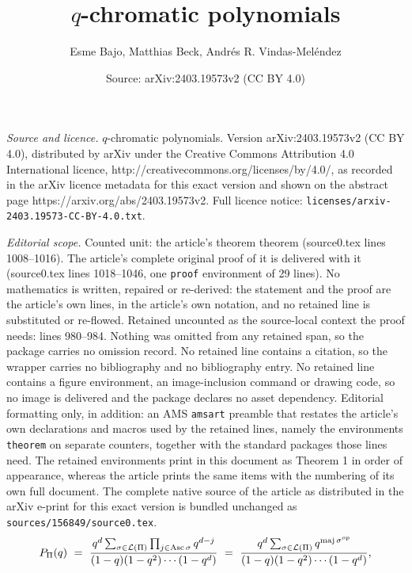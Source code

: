 \documentclass[10pt,a4paper]{amsart}
\title{$q$-chromatic polynomials}
\author{Esme Bajo, Matthias Beck, Andr\'es R. Vindas-Mel\'endez}
\date{Source: arXiv:2403.19573v2 (CC BY 4.0)}
\newcommand\Asc{\operatorname{Asc}}
\newcommand\maj{\operatorname{maj}}
\newcommand\op{^{\rm op}}
\begin{document}
\maketitle

\noindent\emph{Source and licence.} $q$-chromatic polynomials. Version arXiv:2403.19573v2 (CC BY 4.0), distributed by arXiv under the Creative Commons Attribution 4.0 International licence, http://creativecommons.org/licenses/by/4.0/, as recorded in the arXiv licence metadata for this exact version and shown on the abstract page https://arxiv.org/abs/2403.19573v2. Full licence notice: \texttt{licenses/arxiv-2403.19573-CC-BY-4.0.txt}.\par\smallskip

\noindent\textit{Editorial scope.} Counted unit: the article's theorem theorem (source0.tex lines 1008--1016). The article's complete original proof of it is delivered with it (source0.tex lines 1018--1046, one \texttt{proof} environment of 29 lines). No mathematics is written, repaired or re-derived: the statement and the proof are the article's own lines, in the article's own notation, and no retained line is substituted or re-flowed.  Retained uncounted as the source-local context the proof needs: lines 980--984.  Nothing was omitted from any retained span, so the package carries no omission record.  No retained line contains a citation, so the wrapper carries no bibliography and no bibliography entry.  No retained line contains a figure environment, an image-inclusion command or drawing code, so no image is delivered and the package declares no asset dependency.  Editorial formatting only, in addition: an AMS \texttt{amsart} preamble that restates the article's own declarations and macros used by the retained lines, namely the environments \texttt{theorem} on separate counters, together with the standard packages those lines need.  The retained environments print in this document as Theorem 1 in order of appearance, whereas the article prints the same items with the numbering of its own full document.  The complete native source of the article as distributed in the arXiv e-print for this exact version is bundled unchanged as \texttt{sources/156849/source0.tex}.
\begin{equation}\label{eq:ppartgenfct}
  P_\Pi(q)
  \ = \ \frac{ q^d \sum_{ \sigma \in \mathcal{L}(\Pi) } \prod_{ j \in \Asc \sigma } q^{ d-j } }{ (1-q) (1-q^2) \cdots (1-q^d) } 
  \ = \ \frac{ q^d \sum_{ \sigma \in \mathcal{L}(\Pi) } q^{ \maj \sigma\op } }{ (1-q) (1-q^2) \cdots (1-q^d) }, 
\end{equation}
\end{document}
